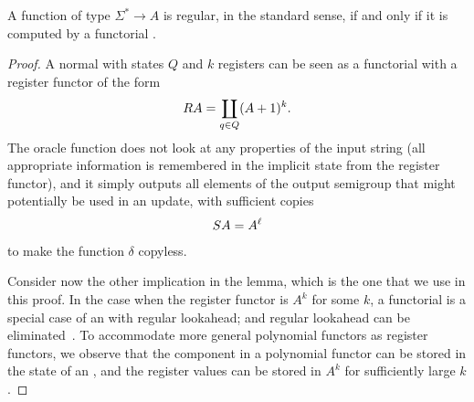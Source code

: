 \begin{lemma}\label{lem:functorial-sst-complete}
    A function of type $\Sigma^* \to A$ is regular, in the standard sense, if and only if it is computed by a functorial \sst. 
\end{lemma}
\begin{proof}
    A normal \sst with states $Q$ and $k$ registers can be seen as a functorial \sst with a register functor of the form 
    \begin{align*}
    \functorr A = \coprod_{q \in Q} (A + 1)^k.
    \end{align*}
    The oracle function does not look at any properties of the input string (all appropriate information is remembered in the implicit state from the register functor), and it simply outputs all elements of the output semigroup that might potentially be used in an update, with sufficient copies 
    \begin{align*}
    \functors A = A^\ell
    \end{align*}
    to make the function $\delta$ copyless. 

    Consider now the other implication in the lemma, which is the one that we use in this proof. In the case when the register functor is $A^k$ for some $k$,  a functorial \sst is a special case of an \sst with regular lookahead; and regular lookahead can be eliminated~\cite[Lemma 13.6]{bojanczyk_automata_2018}. To accommodate more general polynomial functors as register functors, we observe that the component in a polynomial functor can be stored in the state of an \sst, and the register values can be stored in $A^k$ for sufficiently large $k$. 
\end{proof}

